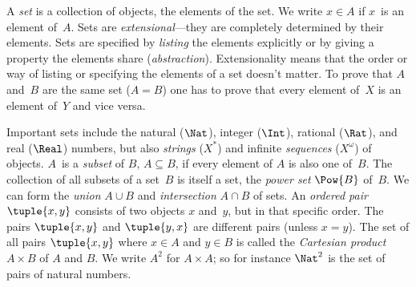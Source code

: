 A \emph{set} is a collection of objects, the elements of the set. We
write $x \in A$ if $x$~is an element of~$A$. Sets are
\emph{extensional}---they are completely determined by their elements.
Sets are specified by \emph{listing} the elements explicitly or by
giving a property the elements share
(\emph{abstraction}). Extensionality means that the order or way of
listing or specifying the elements of a set doesn't matter. To prove
that $A$ and~$B$ are the same set ($A = B$) one has to prove that
every element of~$X$ is an element of~$Y$ and vice versa.

Important sets include the natural ($\Nat$), integer ($\Int$),
rational ($\Rat$), and real ($\Real$) numbers, but also \emph{strings}
($X^*$) and infinite \emph{sequences} ($X^\omega$) of objects. $A$~is
a \emph{subset} of $B$, $A \subseteq B$, if every element of $A$ is
also one of~$B$. The collection of all subsets of a set~$B$ is itself
a set, the \emph{power set} $\Pow{B}$ of~$B$. We can form the
\emph{union} $A \cup B$ and \emph{intersection} $A \cap B$ of sets. An
\emph{ordered pair} $\tuple{x, y}$ consists of two objects $x$
and~$y$, but in that specific order. The pairs $\tuple{x, y}$ and
$\tuple{y, x}$ are different pairs (unless $x = y$). The set of all
pairs $\tuple{x, y}$ where $x \in A$ and $y \in B$ is called the
\emph{Cartesian product}~$A \times B$ of $A$ and $B$. We write $A^2$
for $A \times A$; so for instance $\Nat^2$ is the set of pairs of
natural numbers.
